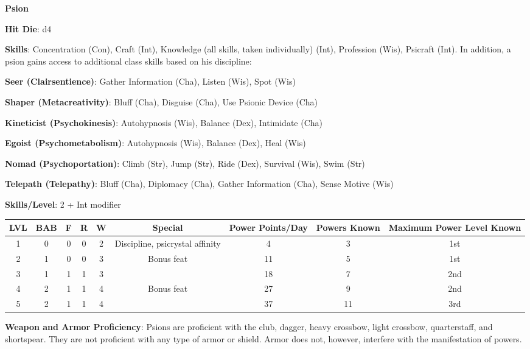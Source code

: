 \textbf{\huge{Psion}}

\textbf{Hit Die}: d4

\textbf{Skills}: Concentration (Con), Craft (Int), Knowledge (all skills, taken individually) (Int), Profession (Wis), Psicraft (Int). In addition, a psion gains access to additional class skills based on his discipline:

\textbf{Seer (Clairsentience)}: Gather Information (Cha), Listen (Wis), Spot (Wis)

\textbf{Shaper (Metacreativity)}: Bluff (Cha), Disguise (Cha), Use Psionic Device (Cha)

\textbf{Kineticist (Psychokinesis)}: Autohypnosis (Wis), Balance (Dex), Intimidate (Cha)

\textbf{Egoist (Psychometabolism)}: Autohypnosis (Wis), Balance (Dex), Heal (Wis)

\textbf{Nomad (Psychoportation)}: Climb (Str), Jump (Str), Ride (Dex), Survival (Wis), Swim (Str)

\textbf{Telepath (Telepathy)}: Bluff (Cha), Diplomacy (Cha), Gather Information (Cha), Sense Motive (Wis)

\textbf{Skills/Level}: 2 + Int modifier

\begin{center}
\begin{adjustwidth}{-4cm}{}
\begin{small}
\begin{tabular}{| c | c | c | c | c | c | c | c | c |}
\hline
LVL &BAB &F &R &W &Special &Power Points/Day &Powers Known &Maximum Power Level Known \\
\hline
1 &0 &0 &0 &2 &Discipline, psicrystal affinity &4 &3 &1st \\
2 &1 &0 &0 &3 &Bonus feat &11 &5 &1st \\
3 &1 &1 &1 &3 & &18 &7 &2nd \\
4 &2 &1 &1 &4 &Bonus feat &27 &9 &2nd \\
5 &2 &1 &1 &4 & &37 &11 &3rd \\
\hline
\end{tabular}
\end{small}
\end{adjustwidth}
\end{center}

\textbf{Weapon and Armor Proficiency}: Psions are proficient with the club, dagger, heavy crossbow, light crossbow, quarterstaff, and shortspear. They are not proficient with any type of armor or shield. Armor does not, however, interfere with the manifestation of powers.

